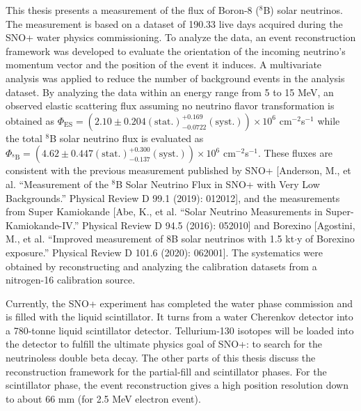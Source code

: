 \begin{doublespacing}
This thesis presents a measurement of the flux of Boron-8 ($^8$B) solar neutrinos. The measurement is based on a dataset of 190.33 live days acquired during the SNO+ water physics commissioning. To analyze the data, an event reconstruction framework was developed to evaluate the orientation of the incoming neutrino's momentum vector and the position of the event it induces. A multivariate analysis was applied to reduce the number of background events in the analysis dataset. By analyzing the data within an energy range from 5 to 15 MeV, an observed elastic scattering flux assuming no neutrino flavor transformation is obtained as $\Phi_{\mathrm{ES}}=(2.10 \pm 0.204 \mathrm{(stat.)}^{+0.169}_{-0.0722}\mathrm{(syst.)})\times10^6$ cm$^{-2}$s$^{-1}$ while the total $^8$B solar neutrino flux is evaluated as $\Phi_{\mathrm{^8B}}=(4.62 \pm 0.447 \mathrm{(stat.)}^{+0.300}_{-0.137}\mathrm{(syst.)})\times10^6$ cm$^{-2}$s$^{-1}$. These fluxes are consistent with the previous measurement published by SNO+ [Anderson, M., et al. ``Measurement of the $^8$B Solar Neutrino Flux in SNO+ with Very Low Backgrounds.'' Physical Review D 99.1 (2019): 012012], and the measurements from Super Kamiokande [Abe, K., et al. ``Solar Neutrino Measurements in Super-Kamiokande-IV.'' Physical Review D 94.5 (2016): 052010] and Borexino [Agostini, M., et al. ``Improved measurement of 8B solar
neutrinos with 1.5 kt$\cdot$y of Borexino exposure.'' Physical Review D 101.6 (2020): 062001]. The systematics were obtained by reconstructing and analyzing the calibration datasets from a nitrogen-16 calibration source.

Currently, the SNO+ experiment has completed the water phase commission and is filled with the liquid scintillator. It turns from a water Cherenkov detector into a 780-tonne liquid scintillator detector. Tellurium-130 isotopes will be loaded into the detector to fulfill the ultimate physics goal of SNO+: to search for the neutrinoless double beta decay. The other parts of this thesis discuss the reconstruction framework for the partial-fill and scintillator phases. For the scintillator phase, the event reconstruction gives a high position resolution down to about 66 mm (for 2.5 MeV electron event).


\end{doublespacing}